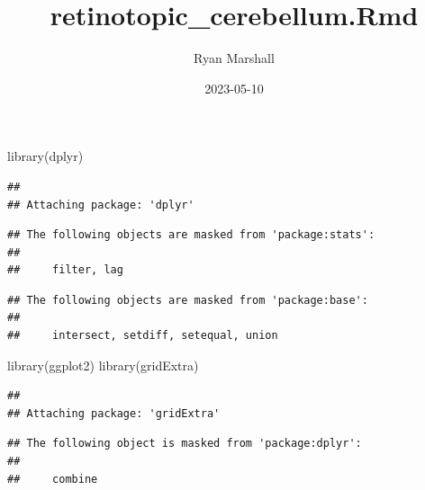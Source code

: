 \documentclass[
]{article}
\title{retinotopic\_cerebellum.Rmd}
\author{Ryan Marshall}
\date{2023-05-10}
\newenvironment{Shaded}{\begin{snugshade}}{\end{snugshade}}
\newcommand{\FunctionTok}[1]{\textcolor[rgb]{0.00,0.00,0.00}{#1}}
\newcommand{\NormalTok}[1]{#1}
\begin{document}
\maketitle

\begin{Shaded}
\begin{Highlighting}[]
\FunctionTok{library}\NormalTok{(dplyr)}
\end{Highlighting}
\end{Shaded}

\begin{verbatim}
## 
## Attaching package: 'dplyr'
\end{verbatim}

\begin{verbatim}
## The following objects are masked from 'package:stats':
## 
##     filter, lag
\end{verbatim}

\begin{verbatim}
## The following objects are masked from 'package:base':
## 
##     intersect, setdiff, setequal, union
\end{verbatim}

\begin{Shaded}
\begin{Highlighting}[]
\FunctionTok{library}\NormalTok{(ggplot2)}
\FunctionTok{library}\NormalTok{(gridExtra)}
\end{Highlighting}
\end{Shaded}

\begin{verbatim}
## 
## Attaching package: 'gridExtra'
\end{verbatim}

\begin{verbatim}
## The following object is masked from 'package:dplyr':
## 
##     combine
\end{verbatim}
\end{document}
